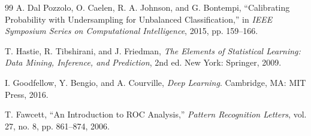 \documentclass[11pt,a4paper]{article}
\begin{document}
\begin{thebibliography}{99}
A. Dal Pozzolo, O. Caelen, R. A. Johnson, and G. Bontempi, ``Calibrating Probability with Undersampling for Unbalanced Classification,'' in \emph{IEEE Symposium Series on Computational Intelligence}, 2015, pp. 159--166.

T. Hastie, R. Tibshirani, and J. Friedman, \emph{The Elements of Statistical Learning: Data Mining, Inference, and Prediction}, 2nd ed. New York: Springer, 2009.

I. Goodfellow, Y. Bengio, and A. Courville, \emph{Deep Learning}. Cambridge, MA: MIT Press, 2016.

T. Fawcett, ``An Introduction to ROC Analysis,'' \emph{Pattern Recognition Letters}, vol. 27, no. 8, pp. 861--874, 2006.
\end{thebibliography}
\end{document}
